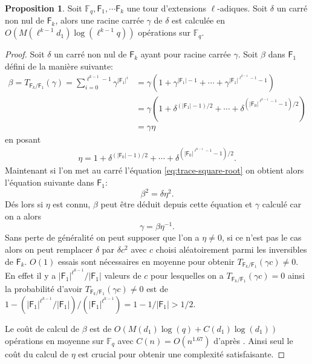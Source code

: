 \documentclass[10pt,a4paper]{book}
\theoremstyle{plain}
\theoremstyle{definition}
\theoremstyle{definition}
\theoremstyle{definition}
\theoremstyle{definition}
\newtheorem{prop}[thm]{Proposition}
\theoremstyle{definition}
\theoremstyle{remark}
\theoremstyle{remark}
\theoremstyle{definition}
\begin{document}
\begin{prop}
Soit $\mathbb{F}_q, \mathsf{F}_1, \cdots \mathsf{F}_k$ une tour d'extensions $\ell$-adiques. Soit $\delta$ un carré non nul de $\mathsf{F}_k$, alors une racine carrée $\gamma$ de $\delta$ est calculée en $O(M(\ell^{k-1}d_1)\log(\ell^{k-1}q))$ opérations sur $\mathbb{F}_q$.
\end{prop}

\begin{proof}
Soit $\delta$ un carré non nul de $\mathsf{F}_k$ ayant pour racine carrée $\gamma$. Soit $\beta$ dans $\mathsf{F}_1$ défini de la manière suivante:
\begin{align}
\label{eq:trace-square-root}
\beta=T_{\mathsf{F}_k/\mathsf{F}_1}(\gamma)=\sum_{i=0}^{\ell^{k-1}-1}\gamma^{|\mathsf{F}_1|^i}&=\gamma(1+\gamma^{|\mathsf{F}_1|-1}+\cdots+ \gamma^{|\mathsf{F}_1|^{\ell^{k-1}-1}-1} ) \\
&=\gamma(1+\delta^{(|\mathsf{F}_1|-1)/2}+\cdots+ \delta^{(|\mathsf{F}_0|^{\ell^{k-1}-1}-1)/2}) \\
&=\gamma \eta
\end{align}
en posant 
\begin{align*}
\eta=1+\delta^{(|\mathsf{F}_0|-1)/2}+\cdots+ \delta^{(|\mathsf{F}_0|^{\ell^{k-1}-1}-1)/2}.
\end{align*}
Maintenant si l'on met au carré l'équation \eqref{eq:trace-square-root} on obtient alors l'équation suivante dans $\mathsf{F}_1$: 
\begin{equation*}
\beta^2=\delta \eta^2. 
\end{equation*}
Dés lors si $\eta$ est connu, $\beta$ peut être déduit depuis cette équation et $\gamma$ calculé car on a alors
\begin{equation*}
 \gamma=\beta \eta^{-1}.
\end{equation*}
Sans perte de généralité on peut supposer que l'on a $\eta \neq 0$, si ce n'est pas le cas alors on peut remplacer $\delta$ par $\delta c^2$ avec $c$ choisi aléatoirement parmi les inversibles de $\mathsf{F}_k$.
$O(1)$ essais sont nécessaires en moyenne pour obtenir $T_{\mathsf{F}_k/\mathsf{F}_1}(\gamma c) \neq 0$. En effet il y a $|\mathsf{F}_1|^{\ell^{k-1}}/|\mathsf{F}_1|$ valeurs de $c$ pour lesquelles on a $T_{\mathsf{F}_k/\mathsf{F}_1}(\gamma c) = 0$ ainsi la probabilité d'avoir $T_{\mathsf{F}_k/\mathsf{F}_1}(\gamma c) \neq 0$ est de $1-(|\mathsf{F}_1|^{\ell^{k-1}}/|\mathsf{F}_1|)/(|\mathsf{F}_1|^{\ell^{k-1}})=1-1/|\mathsf{F}_1|>1/2$.

Le coût de calcul de $\beta$ est de $O(M(d_1)\log(q)+C(d_1)\log(d_1))$ opérations en moyenne sur $\mathbb{F}_q$ avec $C(n)=O(n^{1.67})$ d'après \cite{Doliskani-Schost14}. Ainsi seul le coût du calcul de $\eta$ est crucial pour obtenir une complexité satisfaisante.


\end{proof}
\end{document}
